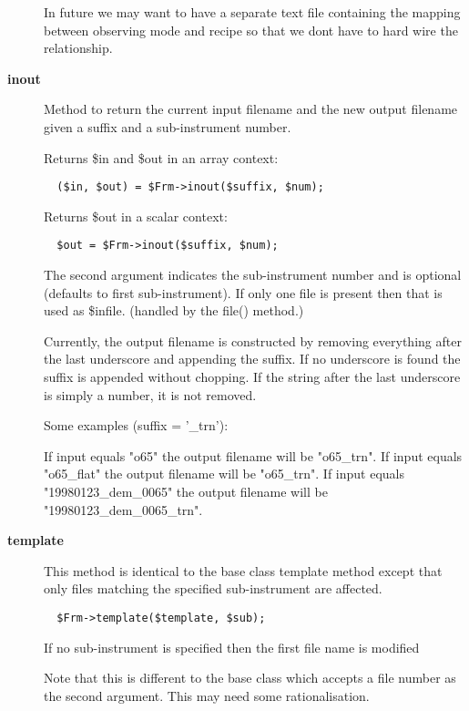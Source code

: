 \begin{description}
In future we may want to have a separate text file containing
the mapping between observing mode and recipe so that
we dont have to hard wire the relationship.

\item[\textbf{inout}] \mbox{}

Method to return the current input filename and the 
new output filename given a suffix and a sub-instrument
number.



Returns \$in and \$out in an array context:

\begin{verbatim}
  ($in, $out) = $Frm->inout($suffix, $num);
\end{verbatim}


Returns \$out in a scalar context:

\begin{verbatim}
  $out = $Frm->inout($suffix, $num);
\end{verbatim}


The second argument indicates the sub-instrument number
and is optional (defaults to first sub-instrument).
If only one file is present then that is used as \$infile.
(handled by the file() method.)



Currently, the output filename is constructed by removing
everything after the last underscore and appending the suffix.
If no underscore is found the suffix is appended without chopping.
If the string after the last underscore is simply a number,
it is not removed.



Some examples (suffix = '\_trn'):



If input equals "o65" the output filename will be "o65\_trn".
If input equals "o65\_flat" the output filename will be "o65\_trn".
If input equals "19980123\_dem\_0065" the output filename will be
"19980123\_dem\_0065\_trn".

\item[\textbf{template}] \mbox{}

This method is identical to the base class template method
except that only files matching the specified sub-instrument
are affected.

\begin{verbatim}
  $Frm->template($template, $sub);
\end{verbatim}


If no sub-instrument is specified then the first file name
is modified



Note that this is different to the base class which accepts
a file number as the second argument. This may need some
rationalisation.

\end{description}
